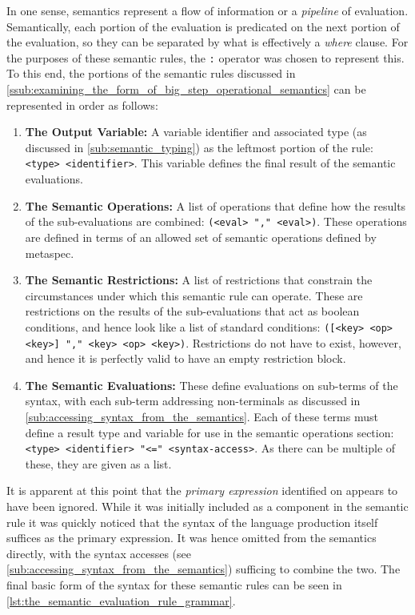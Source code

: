 In one sense, semantics represent a flow of information or a \textit{pipeline} of evaluation. 
Semantically, each portion of the evaluation is predicated on the next portion of the evaluation, so they can be separated by what is effectively a \textit{where} clause. 
For the purposes of these semantic rules, the \texttt{:} operator was chosen to represent this.
To this end, the portions of the semantic rules discussed in \autoref{ssub:examining_the_form_of_big_step_operational_semantics} can be represented in order as follows:
\begin{enumerate}
    \item \textbf{The Output Variable:} A variable identifier and associated type (as discussed in \autoref{sub:semantic_typing}) as the leftmost portion of the rule: \texttt{<type> <identifier>}.
    This variable defines the final result of the semantic evaluations.
    \item \textbf{The Semantic Operations:} A list of operations that define how the results of the sub-evaluations are combined: \texttt{(<eval> {"," <eval>})}.
    These operations are defined in terms of an allowed set of semantic operations defined by metaspec. 
    \item \textbf{The Semantic Restrictions:} A list of restrictions that constrain the circumstances under which this semantic rule can operate.
    These are restrictions on the results of the sub-evaluations that act as boolean conditions, and hence look like a list of standard conditions: \texttt{([<key> <op> <key>] {"," <key> <op> <key>})}.
    Restrictions do not have to exist, however, and hence it is perfectly valid to have an empty restriction block.
    \item \textbf{The Semantic Evaluations:} These define evaluations on sub-terms of the syntax, with each sub-term addressing non-terminals as discussed in \autoref{sub:accessing_syntax_from_the_semantics}. 
    Each of these terms must define a result type and variable for use in the semantic operations section: \texttt{<type> <identifier> "<=" <syntax-access>}.
    As there can be multiple of these, they are given as a list.
\end{enumerate}

It is apparent at this point that the \textit{primary expression} identified on  appears to have been ignored.
While it was initially included as a component in the semantic rule it was quickly noticed that the syntax of the language production itself suffices as the primary expression.
It was hence omitted from the semantics directly, with the syntax accesses (see \autoref{sub:accessing_syntax_from_the_semantics}) sufficing to combine the two. 
The final basic form of the syntax for these semantic rules can be seen in \autoref{lst:the_semantic_evaluation_rule_grammar}.

